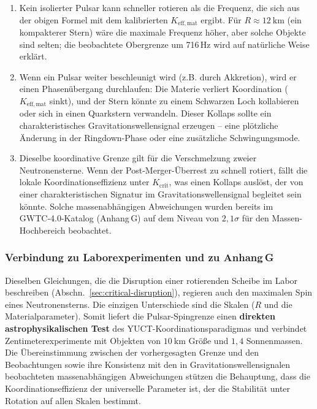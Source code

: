 \documentclass[12pt,a4paper]{article}
\begin{document}
	\begin{enumerate}
		\item Kein isolierter Pulsar kann schneller rotieren als die Frequenz, die sich aus der obigen Formel mit dem kalibrierten \(K_{\mathrm{eff,mat}}\) ergibt. Für \(R\approx 12\ \text{km}\) (ein kompakterer Stern) wäre die maximale Frequenz höher, aber solche Objekte sind selten; die beobachtete Obergrenze um 716 Hz wird auf natürliche Weise erklärt.
		\item Wenn ein Pulsar weiter beschleunigt wird (z.B. durch Akkretion), wird er einen Phasenübergang durchlaufen: Die Materie verliert Koordination (\(K_{\mathrm{eff,mat}}\) sinkt), und der Stern könnte zu einem Schwarzen Loch kollabieren oder sich in einen Quarkstern verwandeln. Dieser Kollaps sollte ein charakteristisches Gravitationswellensignal erzeugen – eine plötzliche Änderung in der Ringdown-Phase oder eine zusätzliche Schwingungsmode.
		\item Dieselbe koordinative Grenze gilt für die Verschmelzung zweier Neutronensterne. Wenn der Post-Merger-Überrest zu schnell rotiert, fällt die lokale Koordinationseffizienz unter \(K_{\mathrm{crit}}\), was einen Kollaps auslöst, der von einer charakteristischen Signatur im Gravitationswellensignal begleitet sein könnte. Solche massenabhängigen Abweichungen wurden bereits im GWTC‑4.0-Katalog (Anhang G) auf dem Niveau von \(2,1\sigma\) für den Massen-Hochbereich beobachtet.
	\end{enumerate}
	
	\subsubsection{Verbindung zu Laborexperimenten und zu Anhang G}
	
	Dieselben Gleichungen, die die Disruption einer rotierenden Scheibe im Labor beschreiben (Abschn.~\ref{sec:critical-disruption}), regieren auch den maximalen Spin eines Neutronensterns. Die einzigen Unterschiede sind die Skalen (\(R\) und die Materialparameter). Somit liefert die Pulsar-Spingrenze einen \textbf{direkten astrophysikalischen Test} des YUCT-Koordinationsparadigmas und verbindet Zentimeterexperimente mit Objekten von \(10\ \text{km}\) Größe und \(1,4\) Sonnenmassen. Die Übereinstimmung zwischen der vorhergesagten Grenze und den Beobachtungen sowie ihre Konsistenz mit den in Gravitationswellensignalen beobachteten massenabhängigen Abweichungen stützen die Behauptung, dass die Koordinationseffizienz der universelle Parameter ist, der die Stabilität unter Rotation auf allen Skalen bestimmt.
	
\end{document}
